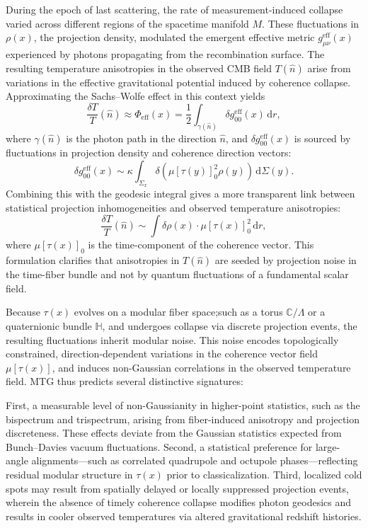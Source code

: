\documentclass[11pt]{article}
\begin{document}
During the epoch of last scattering, the rate of measurement-induced collapse varied across different regions of the spacetime manifold \( M \). These fluctuations in \( \rho(x) \), the projection density, modulated the emergent effective metric \( g^{\mathrm{eff}}_{\mu\nu}(x) \) experienced by photons propagating from the recombination surface. The resulting temperature anisotropies in the observed CMB field \( T(\hat{n}) \) arise from variations in the effective gravitational potential induced by coherence collapse. Approximating the Sachs--Wolfe effect in this context yields
\begin{equation}
\frac{\delta T}{T}(\hat{n}) \approx \Phi_{\mathrm{eff}}(x) = \frac{1}{2} \int_{\gamma(\hat{n})} \delta g^{\mathrm{eff}}_{00}(x) \, \mathrm{d}r,
\end{equation}
where \( \gamma(\hat{n}) \) is the photon path in the direction \( \hat{n} \), and \( \delta g^{\mathrm{eff}}_{00}(x) \) is sourced by fluctuations in projection density and coherence direction vectors:
\begin{equation}
\delta g^{\mathrm{eff}}_{00}(x) \sim \kappa \int_{\Sigma_x} \delta \left( \mu[\tau(y)]_0^2 \rho(y) \right) \, \mathrm{d}\Sigma(y).
\end{equation}
Combining this with the geodesic integral gives a more transparent link between statistical projection inhomogeneities and observed temperature anisotropies:
\begin{equation}
\frac{\delta T}{T}(\hat{n}) \sim \int \delta \rho(x) \cdot \mu[\tau(x)]_0^2 \, \mathrm{d}r,
\end{equation}
where \( \mu[\tau(x)]_0 \) is the time-component of the coherence vector. This formulation clarifies that anisotropies in \( T(\hat{n}) \) are seeded by projection noise in the time-fiber bundle and not by quantum fluctuations of a fundamental scalar field.

Because \( \tau(x) \) evolves on a modular fiber space;such as a torus \( \mathbb{C}/\Lambda \) or a quaternionic bundle \( \mathbb{H} \), and undergoes collapse via discrete projection events, the resulting fluctuations inherit modular noise. This noise encodes topologically constrained, direction-dependent variations in the coherence vector field \( \mu[\tau(x)] \), and induces non-Gaussian correlations in the observed temperature field. MTG thus predicts several distinctive signatures: 

First, a measurable level of non-Gaussianity in higher-point statistics, such as the bispectrum and trispectrum, arising from fiber-induced anisotropy and projection discreteness. These effects deviate from the Gaussian statistics expected from Bunch--Davies vacuum fluctuations. Second, a statistical preference for large-angle alignments—such as correlated quadrupole and octupole phases—reflecting residual modular structure in \( \tau(x) \) prior to classicalization. Third, localized cold spots may result from spatially delayed or locally suppressed projection events, wherein the absence of timely coherence collapse modifies photon geodesics and results in cooler observed temperatures via altered gravitational redshift histories.
\end{document}
